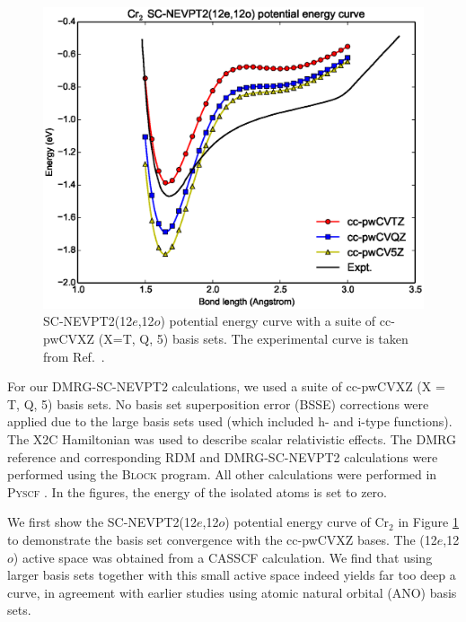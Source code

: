 \begin{figure}
  \includegraphics[width=1.1\columnwidth]{Cr2-nevpt2.eps}
  \caption{SC-NEVPT2(12$e$,12$o$) potential energy curve with a suite of cc-pwCVXZ (X=T, Q, 5) basis sets.
The experimental curve is taken from Ref.~.
  }
  \label{fig:12o_nevpt2}
\end{figure}

For our DMRG-SC-NEVPT2 calculations, we used a suite of cc-pwCVXZ (X = T, Q, 5) basis sets. No basis set superposition error (BSSE) corrections were applied 
due to the large basis sets used (which included h- and i-type functions). The X2C Hamiltonian was used to describe scalar relativistic effects. 
The DMRG reference and corresponding RDM and DMRG-SC-NEVPT2 calculations were performed using the \textsc{Block} program\cite{sharma_spin-adapted_2012}. 
All other calculations were performed in \textsc{Pyscf} \cite{sun_pyscf}. In the figures, the energy of the isolated atoms is set to zero.

We first show the SC-NEVPT2(12$e$,12$o$) potential energy curve of Cr$_2$ in Figure \ref{fig:12o_nevpt2} 
to demonstrate the basis set convergence with the cc-pwCVXZ bases. The (12$e$,12$o$) active space was obtained from a CASSCF calculation. We find that
using larger basis sets together with this small active space indeed yields far too deep a curve, in agreement with earlier studies  using atomic natural orbital (ANO) basis sets.~\cite{angeli_third-order_2006}

